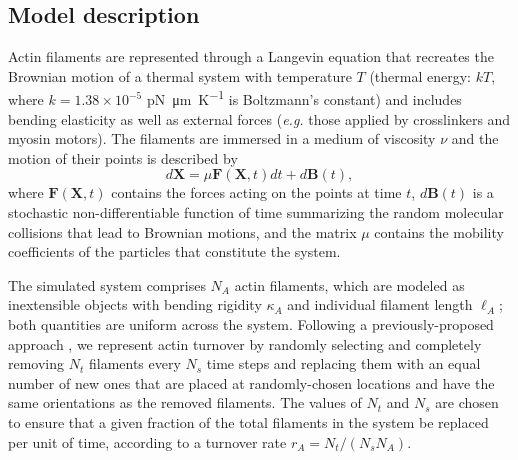 \subsection{Model description}



Actin filaments are represented through a Langevin equation that recreates the Brownian motion of a thermal system with temperature $T$ (thermal energy: $kT$, where $k = 1.38 \times 10^{-5}$ \si{\pico\newton \micro\meter \per \kelvin} is Boltzmann's constant) and includes bending elasticity as well as external forces (\textit{e.g.} those applied by crosslinkers and myosin motors). The filaments are immersed in a medium of viscosity $\nu$ and the motion of their points is described by 
\begin{equation}\label{eq:cytosim}
	d\bm{X} = \mu \bm{F}(\bm{X},t) dt + d\bm{B}(t),
\end{equation}
where $\bm{F}(\bm{X},t)$ contains the forces acting on the points at time $t$, $d\bm{B}(t)$ is a stochastic non-differentiable function of time summarizing the random molecular collisions that lead to Brownian motions, and the matrix $\mu$ contains the mobility coefficients of the particles that constitute the system.

The simulated system comprises $N_A$ actin filaments, which are modeled as inextensible objects with bending rigidity $\kappa_A$ and individual filament length $\ell_A$; both quantities are uniform across the system. Following a previously-proposed approach \cite{Belmonte2017}, we represent actin turnover by randomly selecting and completely removing $N_t$ filaments every $N_s$ time steps and replacing them with an equal number of new ones that are placed at randomly-chosen locations and have the same orientations as the removed filaments. The values of $N_t$ and $N_s$ are chosen to ensure that a given fraction of the total filaments in the system be replaced per unit of time, according to a turnover rate $r_A = N_t / (N_s N_A)$.


